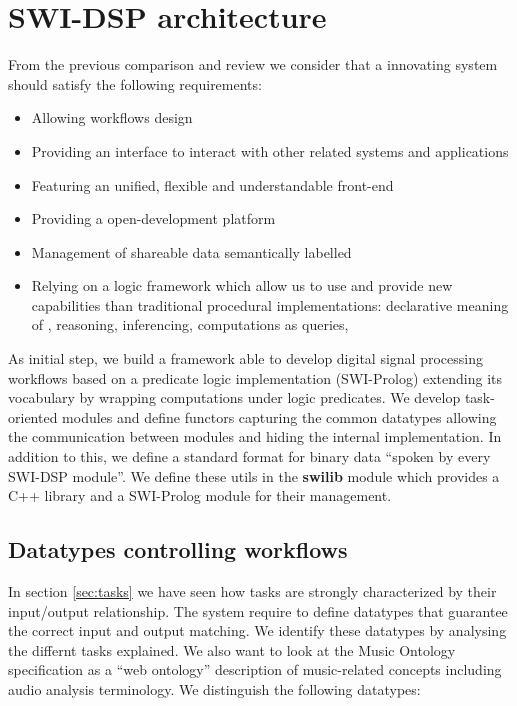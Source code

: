 \documentclass[runningheads]{llncs}
\begin{document}
\section{SWI-DSP architecture}\label{sec:architecture}

From the previous comparison and review we consider that a innovating system should satisfy the following requirements:

\begin{itemize}
 \item Allowing workflows design
 \item Providing an interface to interact with other related systems and applications
 \item Featuring an unified, flexible and understandable front-end
 \item Providing a open-development platform
 \item Management of shareable data semantically labelled
 \item Relying on a logic framework which allow us to use and provide new capabilities than traditional procedural implementations: declarative meaning of , reasoning, inferencing, computations as queries, 
\end{itemize}

As initial step, we build a framework able to develop digital signal processing workflows based on a predicate logic implementation (SWI-Prolog) extending its vocabulary by wrapping computations under logic predicates. We develop task-oriented modules and define functors capturing the common datatypes allowing the communication between modules and hiding the internal implementation. In addition to this, we define a standard format for binary data ``spoken by every SWI-DSP module''. We define these utils in the \textbf{swilib} module which provides a C++ library and a SWI-Prolog module for their management.

\subsection{Datatypes controlling workflows}\label{subsec:datatypes}

In section \ref{sec:tasks} we have seen how tasks are strongly characterized by their input/output relationship. The system require to define datatypes that guarantee the correct input and output matching. We identify these datatypes by analysing the differnt tasks explained. We also want to look at the Music Ontology specification \cite{mo} as a ``web ontology'' description of music-related concepts including audio analysis terminology. We distinguish the following datatypes:
\end{document}
